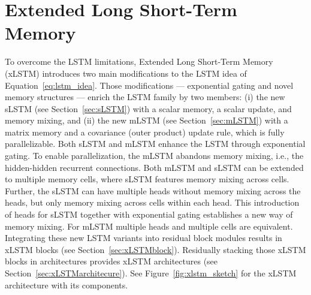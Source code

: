 \documentclass[dvipsnames]{article}
\begin{document}
\section{Extended Long Short-Term Memory}
\label{sec:xLSTM}
To overcome the LSTM limitations, Extended Long Short-Term Memory (xLSTM) introduces
two main modifications to the LSTM idea of Equation~\eqref{eq:lstm_idea}.
Those modifications --- exponential gating and novel memory structures ---
enrich the LSTM family by two members:
(i) the new sLSTM (see Section~\ref{sec:sLSTM}) with a scalar memory, a scalar update, and memory mixing, and
(ii) the new mLSTM (see Section~\ref{sec:mLSTM}) with a matrix memory and a covariance (outer product) update rule,
which is fully parallelizable.
Both sLSTM and mLSTM enhance the LSTM through exponential gating.
To enable parallelization, the mLSTM abandons memory mixing, i.e.,
the hidden-hidden recurrent connections.
Both mLSTM and sLSTM can be extended to multiple memory cells,
where sLSTM features memory mixing across cells.
Further, the sLSTM can have multiple heads without
memory mixing across the heads, but only memory mixing across cells within each head.
This introduction of heads for sLSTM together with exponential gating
establishes a new way of memory mixing.
For mLSTM multiple heads and multiple cells are equivalent.
Integrating these new LSTM variants into residual block modules
results in xLSTM blocks (see Section~\ref{sec:xLSTMblock}). Residually stacking those xLSTM blocks
in architectures provides xLSTM architectures (see Section~\ref{sec:xLSTMarchitecure}).
See Figure~\ref{fig:xlstm_sketch} for the xLSTM architecture with its components.
\end{document}
